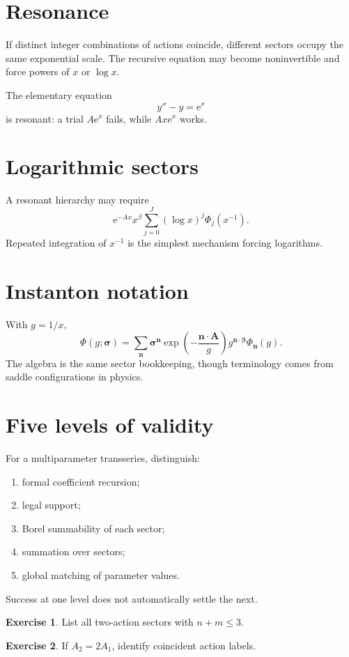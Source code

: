 \documentclass[11pt,oneside,openany]{book}
\newcommand{\e}{\mathrm{e}}
\theoremstyle{plain}
\theoremstyle{definition}
\newtheorem{exercise}{Exercise}[chapter]
\theoremstyle{remark}
\begin{document}
\section{Resonance}
If distinct integer combinations of actions coincide, different sectors occupy the same exponential scale. The recursive equation may become noninvertible and force powers of $x$ or $\log x$.

The elementary equation
\[
  y''-y=\e^x
\]
is resonant: a trial $A\e^x$ fails, while $Ax\e^x$ works.

\section{Logarithmic sectors}
A resonant hierarchy may require
\[
  \e^{-Ax}x^\beta
  \sum_{j=0}^{J}(\log x)^j\Phi_j(x^{-1}).
\]
Repeated integration of $x^{-1}$ is the simplest mechanism forcing logarithms.

\section{Instanton notation}
With $g=1/x$,
\[
  \Phi(g;\bm\sigma)=
  \sum_{\bm n}\bm\sigma^{\bm n}
  \exp\left(-\frac{\bm n\cdot\bm A}{g}\right)
  g^{\bm n\cdot\bm\beta}
  \Phi_{\bm n}(g).
\]
The algebra is the same sector bookkeeping, though terminology comes from saddle configurations in physics.

\section{Five levels of validity}
For a multiparameter transseries, distinguish:
\begin{enumerate}
  \item formal coefficient recursion;
  \item legal support;
  \item Borel summability of each sector;
  \item summation over sectors;
  \item global matching of parameter values.
\end{enumerate}
Success at one level does not automatically settle the next.

\begin{exercise}
List all two-action sectors with $n+m\le3$.
\end{exercise}

\begin{exercise}
If $A_2=2A_1$, identify coincident action labels.
\end{exercise}
\end{document}
